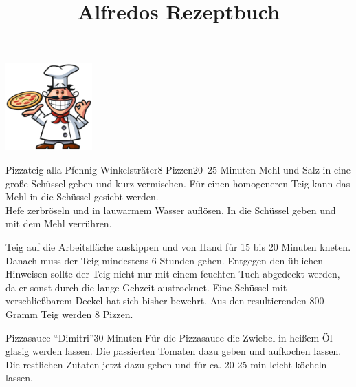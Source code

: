 \documentclass[12pt]{article}
\title{Alfredos Rezeptbuch}
\date{}
\begin{document}
\maketitle

\vspace{-1.5cm}
\centering
\includegraphics[width=0.25\textwidth]{alfredo.png}

\begin{recipe}{Pizzateig alla Pfennig-Winkelsträter}{8 Pizzen}{20--25 Minuten}
	Mehl und Salz in eine große Schüssel geben und kurz vermischen.
	Für einen homogeneren Teig kann das Mehl in die Schüssel gesiebt werden.
	\\	

	Hefe zerbröseln und in lauwarmem Wasser auflösen.
	In die Schüssel geben und mit dem Mehl verrühren.
	\\

	\freeform
	
	Teig auf die Arbeitsfläche auskippen und von Hand für 15 bis 20 Minuten kneten.
	Danach muss der Teig mindestens 6 Stunden gehen.
	Entgegen den üblichen Hinweisen sollte der Teig nicht nur mit einem feuchten Tuch abgedeckt werden, da er sonst durch die lange Gehzeit austrocknet.
	Eine Schüssel mit verschließbarem Deckel hat sich bisher bewehrt.
 	Aus den resultierenden 800 Gramm Teig werden 8 Pizzen.
\end{recipe}

\clearpage

\begin{recipe}{Pizzasauce ``Dimitri''}{}{30 Minuten}
	Für die Pizzasauce die Zwiebel in heißem Öl glasig werden lassen. Die passierten Tomaten dazu geben und aufkochen lassen.
	\\

	Die restlichen Zutaten jetzt dazu geben und für ca. 20-25 min leicht köcheln lassen.
\end{recipe}
\end{document}
